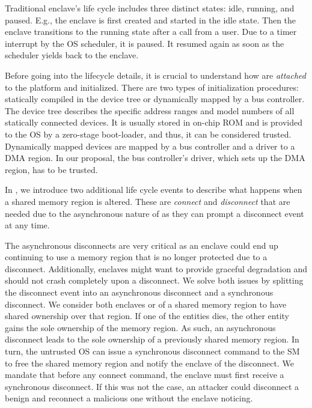 Traditional enclave's life cycle includes three distinct states: idle, running, and paused. E.g., the enclave is first created and started in the idle state. Then the enclave transitions to the running state after a call from a user. Due to a timer interrupt by the OS scheduler, it is paused. It resumed again as soon as the scheduler yields back to the enclave. 

Before going into the lifecycle details, it is crucial to understand how \sphw are \emph{attached} to the platform and initialized.
There are two types of initialization procedures: statically compiled in the device tree or dynamically mapped by a bus controller. 
The device tree describes the specific address ranges and model numbers of all statically connected \sphw devices. It is usually stored in on-chip ROM and is provided to the OS by a zero-stage boot-loader, and thus, it can be considered trusted.
Dynamically mapped devices are mapped by a bus controller and a driver to a DMA region. In our proposal, the bus controller's driver, which sets up the DMA region, has to be trusted.

In \name{}, we introduce two additional life cycle events to describe what happens when a shared memory region is altered. These are \emph{connect} and \emph{disconnect} that are needed due to the asynchronous nature of \sphw as they can prompt a disconnect event at any time.

The asynchronous disconnects are very critical as an enclave could end up continuing to use a memory region that is no longer protected due to a disconnect. Additionally, enclaves might want to provide graceful degradation and should not crash completely upon a disconnect. We solve both issues by splitting the disconnect event into an asynchronous disconnect and a synchronous disconnect. We consider both enclaves or \sphw of a shared memory region to have shared ownership over that region. If one of the entities dies, the other entity gains the sole ownership of the memory region. As such, an asynchronous disconnect leads to the sole ownership of a previously shared memory region. In turn, the untrusted OS can issue a synchronous disconnect command to the SM to free the shared memory region and notify the enclave of the disconnect. We mandate that before any connect command, the enclave must first receive a synchronous disconnect. If this was not the case, an attacker could disconnect a benign \sphw and reconnect a malicious one without the enclave noticing.


